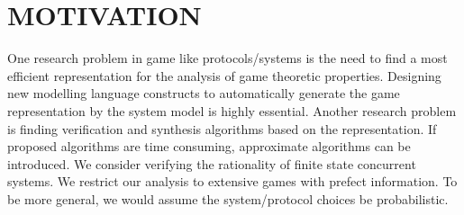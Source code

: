 \section{MOTIVATION}
One research problem in game like protocols/systems is the need to find a most efficient representation for the analysis of game theoretic properties. Designing new modelling language constructs to automatically generate the game representation by the system model is highly essential.  Another research problem is finding verification and synthesis algorithms based on the representation. If proposed algorithms are time consuming, approximate algorithms can be introduced.\newline
We consider verifying the rationality of finite state concurrent systems. We restrict our analysis to extensive games with prefect information. To be more general, we would assume the system/protocol choices be probabilistic.